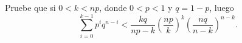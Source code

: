 \begin{statement}{29}
  Pruebe que si $0 < k < np$, donde $0 < p < 1$ y $q = 1 - p$, luego
  \[
    \sum_{i = 0}^{k - 1} p^i q^{n - i} < \frac{kq}{np - k}
    \left(\frac{np}{k}\right)^k
    \left(\frac{nq}{n - k}\right)^{n - k}.
  \]
\end{statement}